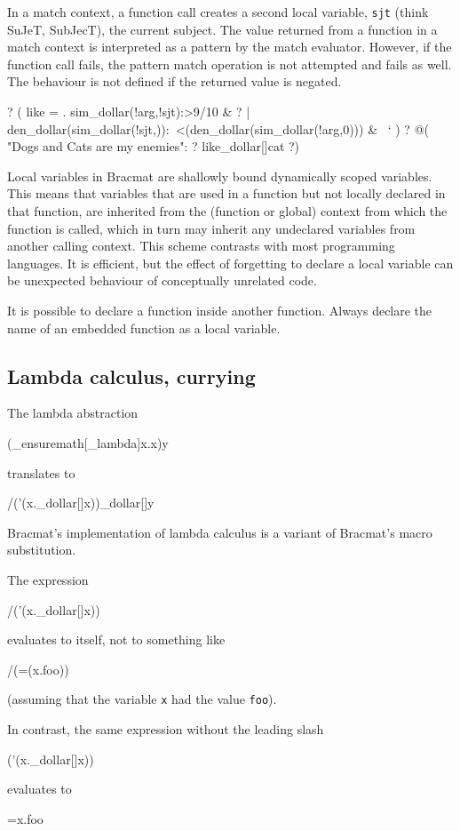\documentclass[12pt]{article}
\begin{document}
In a match context, a function call creates a second local variable,
\verb|sjt| (think SuJeT, SubJecT), the current subject. The value returned
from a function in a match context is interpreted as a pattern by the
match evaluator. However, if the function call fails, the pattern
match operation is not attempted and fails as well. The behaviour is
not defined if the returned value is negated.
\begin{ex}
{?} ( like
    =
      .   sim_dollar(!arg,!sjt):>9/10 & ?
        |   den_dollar(sim_dollar(!sjt,)):~<(den_dollar(sim_dollar(!arg,0)))
          & ~`
    )
{?} @( "Dogs and Cats are my enemies": ? like_dollar[]cat ?)
\end{ex}

Local variables in Bracmat are shallowly bound dynamically scoped
variables. This means that variables that are used in a function but
not locally declared in that function, are inherited from the
(function or global) context from which the function is called, which
in turn may inherit any undeclared variables from another calling
context. This scheme contrasts with most programming languages. It is
efficient, but the effect of forgetting to declare a local variable
can be unexpected behaviour of conceptually unrelated code.

It is possible to declare a function inside another function. Always
declare the name of an embedded function as a local variable.

\subsection{Lambda calculus, currying}

The lambda abstraction
\begin{v}
(_ensuremath[_lambda]x.x)y
\end{v}
translates to
\begin{v}
/('(x._dollar[]x))_dollar[]y
\end{v}

Bracmat's implementation of lambda calculus is a variant of Bracmat's
macro substitution.

The expression
\begin{v}
/('(x._dollar[]x))
\end{v}
evaluates to itself, not to something like
\begin{v}
/(=(x.foo))
\end{v}
(assuming that the variable \verb|x| had the value \verb|foo|).

In contrast, the same expression without the leading slash
\begin{v}
('(x._dollar[]x))
\end{v}
evaluates to
\begin{v}
=x.foo
\end{v}
\end{document}
